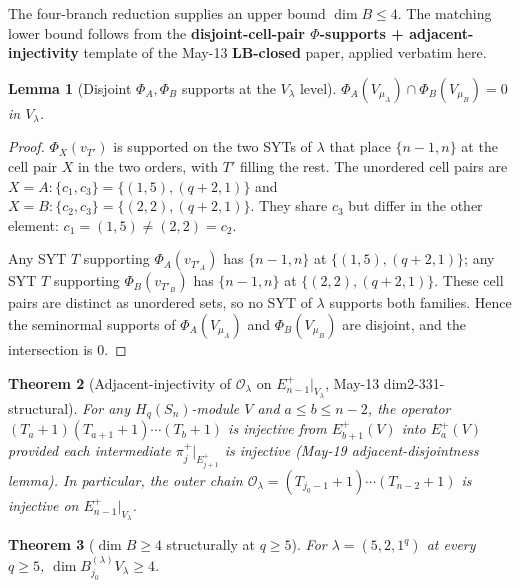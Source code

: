 \documentclass[11pt]{article}
\newtheorem{theorem}{Theorem}
\newtheorem{lemma}[theorem]{Lemma}
\theoremstyle{definition}
\begin{document}
The four-branch reduction supplies an upper bound $\dim B \le 4$. The
matching lower bound follows from the
\textbf{disjoint-cell-pair $\Phi$-supports + adjacent-injectivity}
template of the May-13 \textbf{LB-closed} paper, applied verbatim
here.

\begin{lemma}[Disjoint $\Phi_A, \Phi_B$ supports at the $V_\lambda$ level]\label{lem:disjoint-AB}
$\Phi_A(V_{\mu_A}) \cap \Phi_B(V_{\mu_B}) = 0$ in $V_\lambda$.
\end{lemma}

\begin{proof}
$\Phi_X(v_{T'})$ is supported on the two SYTs of $\lambda$ that
place $\{n-1, n\}$ at the cell pair $X$ in the two orders, with $T'$
filling the rest. The unordered cell pairs are
$X = A: \{c_1, c_3\} = \{(1, 5), (q+2, 1)\}$ and
$X = B: \{c_2, c_3\} = \{(2, 2), (q+2, 1)\}$. They share $c_3$ but
differ in the other element: $c_1 = (1, 5) \ne (2, 2) = c_2$.

Any SYT $T$ supporting $\Phi_A(v_{T'_A})$ has $\{n-1, n\}$ at
$\{(1, 5), (q+2, 1)\}$; any SYT $T$ supporting $\Phi_B(v_{T'_B})$
has $\{n-1, n\}$ at $\{(2, 2), (q+2, 1)\}$. These cell pairs are
distinct as unordered sets, so no SYT of $\lambda$ supports both
families. Hence the seminormal supports of $\Phi_A(V_{\mu_A})$ and
$\Phi_B(V_{\mu_B})$ are disjoint, and the intersection is $0$.
\end{proof}

\begin{theorem}[Adjacent-injectivity of $\mathcal{O}_\lambda$ on $E_{n-1}^+|_{V_\lambda}$,
May-13 dim2-331-structural]\label{thm:adjacent-inj}
For any $H_q(S_n)$-module $V$ and $a \le b \le n - 2$, the operator
$(T_a{+}1)(T_{a+1}{+}1)\cdots(T_b{+}1)$ is injective from
$E_{b+1}^+(V)$ into $E_a^+(V)$ provided each intermediate
$\pi_j^+ |_{E_{j+1}^+}$ is injective (May-19 adjacent-disjointness
lemma). In particular, the outer chain
$\mathcal{O}_\lambda = (T_{j_0-1}{+}1)\cdots(T_{n-2}{+}1)$ is injective
on $E_{n-1}^+|_{V_\lambda}$.
\end{theorem}

\begin{theorem}[$\dim B \ge 4$ structurally at $q \ge 5$]\label{thm:LB}
For $\lambda = (5, 2, 1^q)$ at every $q \ge 5$,
$\dim B^{(\lambda)}_{j_0} V_\lambda \ge 4$.
\end{theorem}
\end{document}
